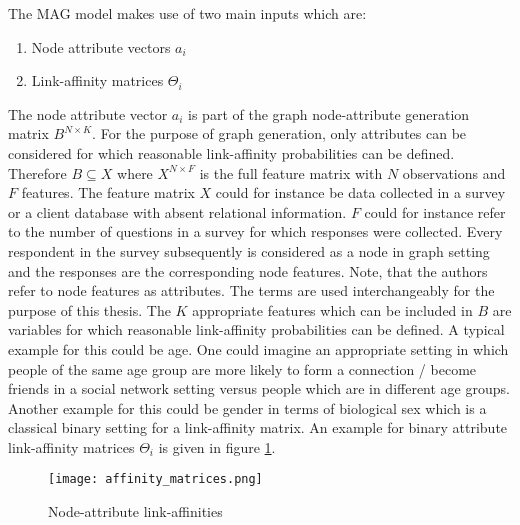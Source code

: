 	\noindent The MAG model makes use of two main inputs which are:

	\begin{enumerate}
		\item Node attribute vectors $a_i$
		\item Link-affinity matrices $\Theta_i$
	\end{enumerate}

	\noindent The node attribute vector $a_i$ is part of the graph node-attribute
	generation matrix $B^{N \times K}$. For the purpose of graph generation, 
	only attributes can be considered for which reasonable link-affinity 
	probabilities can be defined. Therefore $B \subseteq X$ where $X^{N \times F}$ 
	is the full feature matrix with $N$ observations and $F$ features. The 
	feature matrix $X$ could for instance be data collected in a survey or a 
	client database with absent relational information. $F$ could for instance 
	refer to the number of questions in a survey for which responses were 
	collected. Every respondent in the survey subsequently is considered as a 
	node in graph setting and the responses are the corresponding node features. 
	Note, that the authors refer to node features as attributes. The terms are 
	used interchangeably for the purpose of this thesis. The $K$ appropriate 
	features which can be included in $B$ are variables for which reasonable
	link-affinity probabilities can be defined. A typical example for this 
	could be age. One could imagine an appropriate setting in which people of 
	the same age group are more likely to form a connection / become friends in 
	a social network setting versus people which are in different age groups. 
	Another example for this could be gender in terms of biological sex which 
	is a classical binary setting for a link-affinity matrix. An example for 
	binary attribute link-affinity matrices $\Theta_i$ is given in figure 
	\ref{fig:link-affinity}.

	\begin{figure}[h]
		\centering
		\texttt{[image: affinity\_matrices.png]}
		\caption{Node-attribute link-affinities}
		\cite[p. 118]{kim2012multiplicative}
		\label{fig:link-affinity}
	\end{figure}


